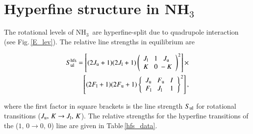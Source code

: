 \documentclass{aa}
\newcommand{\ammonia}{{\rm NH}$_3$}
\begin{document}

\section{Hyperfine structure in \ammonia}

The rotational levels of \ammonia\ are hyperfine-split due to quadrupole interaction (see Fig.\,\ref{E_lev}).  The relative line strengths in equilibrium are 

\begin{eqnarray}
S_{\rm ul}^{\rm hfs} = \left [ (2 J_{\rm u}+1)(2 J_{\rm l}+1)  \left (  \begin{array}{lcr} J_{\rm l}\; \;\;1 \;\;\;J_{\rm u} \\
                                                                                                                        K \; \;  \;        0\;  -K   \end{array} \right )^2 \right ]     \times    \nonumber \\                                                                                                                                                                                  
 \left [ (2 F_{\rm l} +1)(2 F_{\rm u} +1)  \left \{  \begin{array}{lcr} J_{\rm u}\; \;\;    F_{\rm u} \;\;\;I \\
                                                                                                                                          F_{\rm l}\; \;  \;   J_{\rm l}\;\;\; \;1  \end{array} \right \}^2 \right ] ,                                                                                                                                      
\end{eqnarray}

where the first factor in square brackets is the line strength $S_{\rm ul}$ for rotational transitions ($J_{\rm u},\,K \rightarrow J_{\rm l},\,K$). The relative strengths for the hyperfine transitions of the ($1,\,0 \rightarrow 0,\,0$) line are given in Table\,\ref{hfs_data}. 
\end{document}
